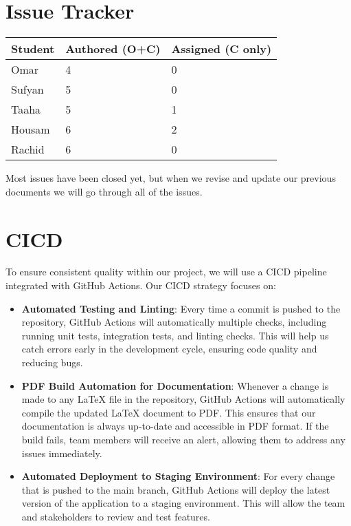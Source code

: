 \documentclass{article}
\begin{document}
\section{Issue Tracker}

\begin{table}[H]
\centering
\begin{tabular}{lll}
\toprule
\textbf{Student} & \textbf{Authored (O+C)} & \textbf{Assigned (C only)}\\
\midrule
Omar & 4 & 0 \\
Sufyan & 5 & 0 \\
Taaha & 5 & 1 \\
Housam & 6 & 2 \\
Rachid & 6 & 0 \\
\bottomrule
\end{tabular}
\end{table}

Most issues have been closed yet, but when we revise and update our previous documents we will go through all of the issues. 
\section{CICD}

To ensure consistent quality within our project, we will use a CICD pipeline integrated with GitHub Actions. Our CICD strategy focuses on:

\begin{itemize}
    \item \textbf{Automated Testing and Linting}: Every time a commit is pushed to the repository, GitHub Actions will automatically multiple checks, including running unit tests, integration tests, and linting checks. This will help us catch errors early in the development cycle, ensuring code quality and reducing bugs.

    \item \textbf{PDF Build Automation for Documentation}: Whenever a change is made to any LaTeX file in the repository, GitHub Actions will automatically compile the updated LaTeX document to PDF. This ensures that our documentation is always up-to-date and accessible in PDF format. If the build fails, team members will receive an alert, allowing them to address any issues immediately.

    \item \textbf{Automated Deployment to Staging Environment}: For every change that is pushed to the main branch, GitHub Actions will deploy the latest version of the application to a staging environment. This will allow the team and stakeholders to review and test features. 

\end{itemize}
\end{document}
